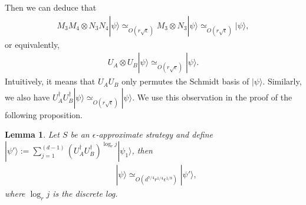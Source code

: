 \documentclass[11pt,letterpaper]{article}
\newcommand{\ket}[1]{|#1\rangle}
\newcommand{\x}{\otimes}
\newcommand{\ct}{^{\dagger}}
\newcommand{\1}{\mathbb{1}}
\newcommand{\ep}{\epsilon}
\newcommand{\se}{\sqrt{\epsilon}}
\newcommand{\appd}[1]{\simeq_{#1}}
\newtheorem{lemma}[theorem]{Lemma}
\theoremstyle{definition}
\begin{document}
Then we can deduce that 
\begin{align}
	M_3M_4 \x N_3N_4 \ket{\psi} \appd{O(r\se)} M_3 \x N_3 \ket{\psi} \appd{O(r\se)} \ket{\psi},
\end{align}
or equivalently,
\begin{align}
	U_A \x U_B \ket{\psi} \appd{O(r\se)} \ket{\psi}.
\end{align}
Intuitively, it means that $U_A U_B $ only permutes the Schmidt basis of $\ket{\psi}$.
Similarly, we also have $U_A\ct U_B\ct \ket{\psi} \appd{O(r\se)} \ket{\psi}$.
We use this observation in the proof of the following proposition.
\begin{lemma}
\label{lm:decomp_psi}
Let $S$ be an $\ep$-approximate strategy and 
define 
$\ket{\psi'} := \sum_{j=1}^{(d-1)} (U_A\ct U_B\ct)^{\log_r j} \ket{\psi_1}$,
then
\begin{align}
	&\ket{\psi} \appd{O(d^{7/4} r^{1/4} \ep^{1/8})} \ket{\psi'},
\end{align}
where $\log_r j$ is the discrete log.
\end{lemma}
\end{document}
